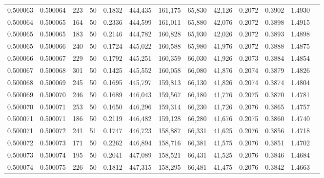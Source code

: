 \begin{tabular}{rrrrrrrrrrrrr}
0.500063 & 0.500064 & 223 &  50 &                                     0.1832 & 444,435 & 161,175 &  65,830 &  42,126 & 0.2072 & 0.3902 & 1.4930 \\
0.500064 & 0.500065 & 164 &  50 &                                     0.2336 & 444,599 & 161,011 &  65,880 &  42,076 & 0.2072 & 0.3898 & 1.4915 \\
0.500065 & 0.500065 & 183 &  50 &                                     0.2146 & 444,782 & 160,828 &  65,930 &  42,026 & 0.2072 & 0.3893 & 1.4898 \\
0.500065 & 0.500066 & 240 &  50 &                                     0.1724 & 445,022 & 160,588 &  65,980 &  41,976 & 0.2072 & 0.3888 & 1.4875 \\
0.500066 & 0.500067 & 229 &  50 &                                     0.1792 & 445,251 & 160,359 &  66,030 &  41,926 & 0.2073 & 0.3884 & 1.4854 \\
0.500067 & 0.500068 & 301 &  50 &                                     0.1425 & 445,552 & 160,058 &  66,080 &  41,876 & 0.2074 & 0.3879 & 1.4826 \\
0.500068 & 0.500069 & 245 &  50 &                                     0.1695 & 445,797 & 159,813 &  66,130 &  41,826 & 0.2074 & 0.3874 & 1.4804 \\
0.500069 & 0.500070 & 246 &  50 &                                     0.1689 & 446,043 & 159,567 &  66,180 &  41,776 & 0.2075 & 0.3870 & 1.4781 \\
0.500070 & 0.500071 & 253 &  50 &                                     0.1650 & 446,296 & 159,314 &  66,230 &  41,726 & 0.2076 & 0.3865 & 1.4757 \\
0.500071 & 0.500071 & 186 &  50 &                                     0.2119 & 446,482 & 159,128 &  66,280 &  41,676 & 0.2075 & 0.3860 & 1.4740 \\
0.500071 & 0.500072 & 241 &  51 &                                     0.1747 & 446,723 & 158,887 &  66,331 &  41,625 & 0.2076 & 0.3856 & 1.4718 \\
0.500072 & 0.500073 & 171 &  50 &                                     0.2262 & 446,894 & 158,716 &  66,381 &  41,575 & 0.2076 & 0.3851 & 1.4702 \\
0.500073 & 0.500074 & 195 &  50 &                                     0.2041 & 447,089 & 158,521 &  66,431 &  41,525 & 0.2076 & 0.3846 & 1.4684 \\
0.500074 & 0.500075 & 226 &  50 &                                     0.1812 & 447,315 & 158,295 &  66,481 &  41,475 & 0.2076 & 0.3842 & 1.4663 \\

\end{tabular}
